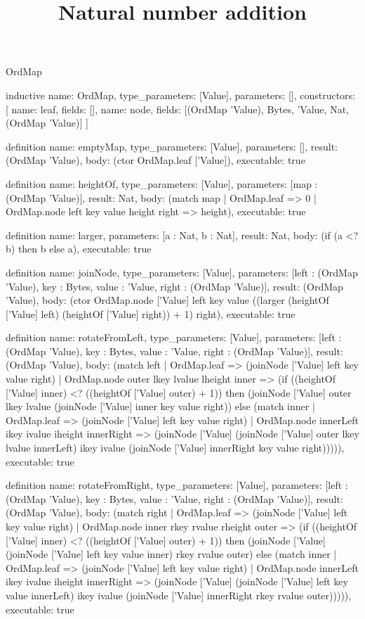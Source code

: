 \begin{lexlean}{OrdMap}
\title{Natural number addition}
\begin{semanticmodule}
inductive{
  name: OrdMap,
  type_parameters: [Value],
  parameters: [],
  constructors: [
    {name: leaf, fields: []},
    {name: node, fields: [(OrdMap 'Value), Bytes, 'Value, Nat, (OrdMap 'Value)]}
  ]
}

definition{
  name: emptyMap,
  type_parameters: [Value],
  parameters: [],
  result: (OrdMap 'Value),
  body: (ctor OrdMap.leaf ['Value]),
  executable: true
}

definition{
  name: heightOf,
  type_parameters: [Value],
  parameters: [map : (OrdMap 'Value)],
  result: Nat,
  body: (match map | OrdMap.leaf => 0 | OrdMap.node left key value height right => height),
  executable: true
}

definition{
  name: larger,
  parameters: [a : Nat, b : Nat],
  result: Nat,
  body: (if (a <? b) then b else a),
  executable: true
}

definition{
  name: joinNode,
  type_parameters: [Value],
  parameters: [left : (OrdMap 'Value), key : Bytes, value : 'Value, right : (OrdMap 'Value)],
  result: (OrdMap 'Value),
  body: (ctor OrdMap.node ['Value] left key value ((larger (heightOf ['Value] left) (heightOf ['Value] right)) + 1) right),
  executable: true
}

definition{
  name: rotateFromLeft,
  type_parameters: [Value],
  parameters: [left : (OrdMap 'Value), key : Bytes, value : 'Value, right : (OrdMap 'Value)],
  result: (OrdMap 'Value),
  body: (match left
    | OrdMap.leaf => (joinNode ['Value] left key value right)
    | OrdMap.node outer lkey lvalue lheight inner => (if ((heightOf ['Value] inner) <? ((heightOf ['Value] outer) + 1)) then (joinNode ['Value] outer lkey lvalue (joinNode ['Value] inner key value right)) else (match inner
      | OrdMap.leaf => (joinNode ['Value] left key value right)
      | OrdMap.node innerLeft ikey ivalue iheight innerRight => (joinNode ['Value] (joinNode ['Value] outer lkey lvalue innerLeft) ikey ivalue (joinNode ['Value] innerRight key value right))))),
  executable: true
}

definition{
  name: rotateFromRight,
  type_parameters: [Value],
  parameters: [left : (OrdMap 'Value), key : Bytes, value : 'Value, right : (OrdMap 'Value)],
  result: (OrdMap 'Value),
  body: (match right
    | OrdMap.leaf => (joinNode ['Value] left key value right)
    | OrdMap.node inner rkey rvalue rheight outer => (if ((heightOf ['Value] inner) <? ((heightOf ['Value] outer) + 1)) then (joinNode ['Value] (joinNode ['Value] left key value inner) rkey rvalue outer) else (match inner
      | OrdMap.leaf => (joinNode ['Value] left key value right)
      | OrdMap.node innerLeft ikey ivalue iheight innerRight => (joinNode ['Value] (joinNode ['Value] left key value innerLeft) ikey ivalue (joinNode ['Value] innerRight rkey rvalue outer))))),
  executable: true
}


\end{semanticmodule}
\end{lexlean}
